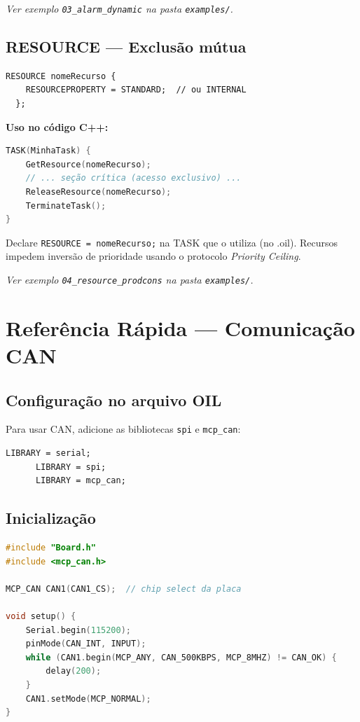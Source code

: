 \documentclass[12pt,a4paper]{article}
\begin{document}
\textit{Ver exemplo \texttt{03\_alarm\_dynamic} na pasta \texttt{examples/}.}

\subsection{RESOURCE --- Exclusão mútua}

\begin{lstlisting}[language=OIL]
  RESOURCE nomeRecurso {
    RESOURCEPROPERTY = STANDARD;  // ou INTERNAL
  };
\end{lstlisting}

\textbf{Uso no código C++:}
\begin{lstlisting}[language=C++]
TASK(MinhaTask) {
    GetResource(nomeRecurso);
    // ... seção crítica (acesso exclusivo) ...
    ReleaseResource(nomeRecurso);
    TerminateTask();
}
\end{lstlisting}

Declare \texttt{RESOURCE = nomeRecurso;} na TASK que o utiliza (no .oil). Recursos impedem inversão de prioridade usando o protocolo \emph{Priority Ceiling}.

\textit{Ver exemplo \texttt{04\_resource\_prodcons} na pasta \texttt{examples/}.}

\section{Referência Rápida --- Comunicação CAN}

\subsection{Configuração no arquivo OIL}

Para usar CAN, adicione as bibliotecas \texttt{spi} e \texttt{mcp\_can}:

\begin{lstlisting}[language=OIL]
      LIBRARY = serial;
      LIBRARY = spi;
      LIBRARY = mcp_can;
\end{lstlisting}

\subsection{Inicialização}

\begin{lstlisting}[language=C++]
#include "Board.h"
#include <mcp_can.h>

MCP_CAN CAN1(CAN1_CS);  // chip select da placa

void setup() {
    Serial.begin(115200);
    pinMode(CAN_INT, INPUT);
    while (CAN1.begin(MCP_ANY, CAN_500KBPS, MCP_8MHZ) != CAN_OK) {
        delay(200);
    }
    CAN1.setMode(MCP_NORMAL);
}
\end{lstlisting}
\end{document}
